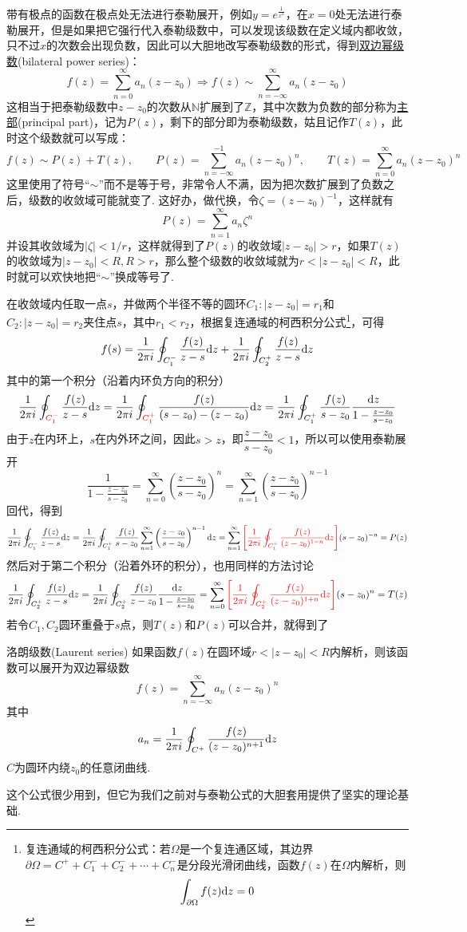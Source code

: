 \documentclass[main.tex]{subfiles}
\begin{document}
带有极点的函数在极点处无法进行泰勒展开，例如\(y=e^{\frac{1}{x^2}}\)，在\(x=0\)处无法进行泰勒展开，但是如果把它强行代入泰勒级数中，可以发现该级数在定义域内都收敛，只不过\(x\)的次数会出现负数，因此可以大胆地改写泰勒级数的形式，得到\uline{双边幂级数}(bilateral power series)：
\[f(z)=\sum_{n=0}^{\infty}a_n(z-z_0) \Longrightarrow f(z)\sim\sum_{n=-\infty}^{\infty}a_n(z-z_0)\]
这相当于把泰勒级数中\(z-z_0\)的次数从\(\mathbb{N}\)扩展到了\(\mathbb{Z}\)，其中次数为负数的部分称为\uline{主部}(principal part)，记为\(P(z)\)，剩下的部分即为泰勒级数，姑且记作\(T(z)\)，此时这个级数就可以写成：
\[f(z) \sim P(z)+T(z), \qquad P(z) = \sum_{n=-\infty}^{-1}a_n(z-z_0)^n, \qquad T(z) = \sum_{n=0}^{\infty}a_n(z-z_0)^n\]
这里使用了符号“\(\sim\)”而不是等于号，非常令人不满，因为把次数扩展到了负数之后，级数的收敛域可能就变了. 这好办，做代换，令\(\zeta = (z-z_0)^{-1}\)，这样就有
\[P(z) = \sum_{n=1}^{\infty}a_n\zeta^n\]
并设其收敛域为\(|\zeta|<1/r\)，这样就得到了\(P(z)\)的收敛域\(|z-z_0|>r\)，如果\(T(z)\)的收敛域为\(|z-z_0|<R, R>r\)，那么整个级数的收敛域就为\(r<|z-z_0|<R\)，此时就可以欢快地把“\(\sim\)”换成等号了.

在收敛域内任取一点\(s\)，并做两个半径不等的圆环\(C_1:|z-z_0|=r_1\)和\(C_2:|z-z_0|=r_2\)夹住点\(s\)，其中\(r_1<r_2\)，根据复连通域的柯西积分公式\footnote{复连通域的柯西积分公式：若\(\Omega\)是一个复连通区域，其边界\(\partial \Omega = C^++C_1^-+C_2^-+\cdots+C_n^-\)是分段光滑闭曲线，函数\(f(z)\)在\(\Omega\)内解析，则\[\int_{\partial \Omega}f(z){\rm d}z=0\]}，可得
\[f(s) = \frac{1}{2\pi i}\oint_{C_1^-}\frac{f(z)}{z-s}{\rm d}z + \frac{1}{2\pi i}\oint_{C_2^+}\frac{f(z)}{z-s}{\rm d}z\]
其中的第一个积分（沿着内环负方向的积分）
\[\frac{1}{2\pi i}\oint_{\color{red} C_1^-}\frac{f(z)}{z-s}{\rm d}z = \frac{1}{2\pi i}\oint_{\color{red} C_1^+}\frac{f(z)}{(s-z_0)-(z-z_0)}{\rm d}z = \frac{1}{2\pi i}\oint_{C_1^+}\frac{f(z)}{s-z_0}\frac{{\rm d}z}{1-\frac{z-z_0}{s-z_0}}\]
由于\(z\)在内环上，\(s\)在内外环之间，因此\(s>z\)，即\(\dfrac{z-z_0}{s-z_0}<1\)，所以可以使用泰勒展开
\[\frac{1}{1-\frac{z-z_0}{s-z_0}} = \sum_{n=0}^{\infty}\left(\frac{z-z_0}{s-z_0}\right)^{n} = \sum_{n=1}^{\infty}\left(\frac{z-z_0}{s-z_0}\right)^{n-1}\]
回代，得到
\[\frac{1}{2\pi i}\oint_{C_1^-}\frac{f(z)}{z-s}{\rm d}z = \frac{1}{2\pi i}\oint_{C_1^+}\frac{f(z)}{s-z_0}\sum_{n=1}^{\infty}\left(\frac{z-z_0}{s-z_0}\right)^{n-1}{\rm d}z = \sum_{n=1}^{\infty}{\color{red}\left[\frac{1}{2\pi i}\oint_{C_1^+}\frac{f(z)}{(z-z_0)^{1-n}}{\rm d}z\right]}(s-z_0)^{-n} = P(z)\]
然后对于第二个积分（沿着外环的积分），也用同样的方法讨论
\[\frac{1}{2\pi i}\oint_{C_2^+}\frac{f(z)}{z-s}{\rm d}z = \frac{1}{2\pi i}\oint_{C_2^+}\frac{f(z)}{z-z_0}\frac{{\rm d}z}{1-\frac{z-z_0}{s-z_0}} = \sum_{n=0}^{\infty}{\color{red}\left[\frac{1}{2\pi i}\oint_{C_2^+}\frac{f(z)}{(z-z_0)^{1+n}}{\rm d}z\right]}(s-z_0)^{n} = T(z)\]
若令\(C_1,C_2\)圆环重叠于\(s\)点，则\(T(z)\)和\(P(z)\)可以合并，就得到了
\begin{theorem}{洛朗级数(Laurent series)}
    如果函数\(f(z)\)在圆环域\(r<|z-z_0|<R\)内解析，则该函数可以展开为双边幂级数
    \[f(z) = \sum_{n=-\infty}^{\infty}a_n(z-z_0)^n\]
    其中
    \[a_n=\frac{1}{2\pi i}\oint_{C^+}\frac{f(z)}{(z-z_0)^{n+1}}{\rm d}z\]
    \(C\)为圆环内绕\(z_0\)的任意闭曲线.
\end{theorem}
这个公式很少用到，但它为我们之前对与泰勒公式的大胆套用提供了坚实的理论基础.
\end{document}
